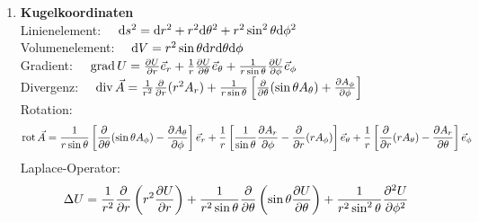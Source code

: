 \documentclass{atistandalonetask}
\begin{document}
\begin{atiTask}[
]
\begin{enumerate}
  Divergenz: $\quad \divergence \vec{A} = \frac{1}{r} \leibnizPartialDerivative{}{r} (rA_r) + \frac{1}{r} \leibnizPartialDerivative{A_\phi}{\phi} + \leibnizPartialDerivative{A_z}{z}$ \\[1em]
  Rotation: $\quad \curl \vec{A} = \left[ \frac{1}{r} \leibnizPartialDerivative{A_z}{\phi} - \leibnizPartialDerivative{A_\phi}{z} \right]\vec{e}_r + \left[ \leibnizPartialDerivative{A_r}{z} - \leibnizPartialDerivative{A_z}{r} \right] \vec{e}_\phi + \frac{1}{r} \left[ \leibnizPartialDerivative{}{r} (rA_\phi) - \leibnizPartialDerivative{A_r}{\phi} \right] \vec{e}_z$ \\[1em]
  Laplace-Operator: $\quad \Delta U = \frac{1}{r} \leibnizPartialDerivative{}{r} \left( r \leibnizPartialDerivative{U}{r} \right) + \frac{1}{r^2} \leibnizPartialDerivative[2]{U}{\phi} + \leibnizPartialDerivative[2]{U}{z}$ 
  \item \textbf{Kugelkoordinaten}\\[1em]
  Linienelement: $\quad \mathrm{d} s^2 = \mathrm{d} r^2 + r^2 \mathrm{d} \theta^2 + r^2 \sin^2 \theta \mathrm{d}\phi^2$ \\[1em] 
  Volumenelement: $\quad \mathrm{d} V = r^2 \sin\theta  \mathrm{d} r \mathrm{d} \theta \mathrm{d} \phi $ \\[1em]
  Gradient: $\quad \gradient U = \leibnizPartialDerivative{U}{r}\vec{e}_r + \frac{1}{r} \leibnizPartialDerivative{U}{\theta} \vec{e}_\theta + \frac{1}{r\sin\theta} \leibnizPartialDerivative{U}{\phi} \vec{e}_\phi$ \\[1em] 
  Divergenz: $\quad \divergence \vec{A} = \frac{1}{r^2} \leibnizPartialDerivative{}{r} (r^2A_r) + \frac{1}{r\sin\theta} \left[ \leibnizPartialDerivative{}{\theta} (\sin\theta A_\theta) + \leibnizPartialDerivative{A_\phi}{\phi} \right]$ \\[1em]
  Rotation: 
  \begin{align*}
\curl \vec{A} = \frac{1}{r\sin\theta} \left[ \leibnizPartialDerivative{}{\theta} (\sin\theta A_\phi) - \leibnizPartialDerivative{A_\theta}{\phi} \right]\vec{e}_r + \frac{1}{r} \left[ \frac{1}{\sin\theta} \leibnizPartialDerivative{A_r}{\phi} - \leibnizPartialDerivative{}{r}    (r A_\phi) \right] \vec{e}_\theta + \frac{1}{r} \left[ \leibnizPartialDerivative{}{r} (rA_\theta) - \leibnizPartialDerivative{A_r}{\theta} \right] \vec{e}_\phi
  \end{align*} 
  Laplace-Operator:
  \begin{align*}
      \Delta U = \frac{1}{r^2} \leibnizPartialDerivative{}{r} \left( r^2 \leibnizPartialDerivative{U}{r} \right) + \frac{1}{r^2 \sin\theta} \leibnizPartialDerivative{}{\theta} \left( \sin\theta \leibnizPartialDerivative{U}{\theta} \right) + \frac{1}{r^2 \sin^2 \theta} \leibnizPartialDerivative[2]{U}{\phi}
  \end{align*}
\end{enumerate}

\end{atiTask}
\end{document}
